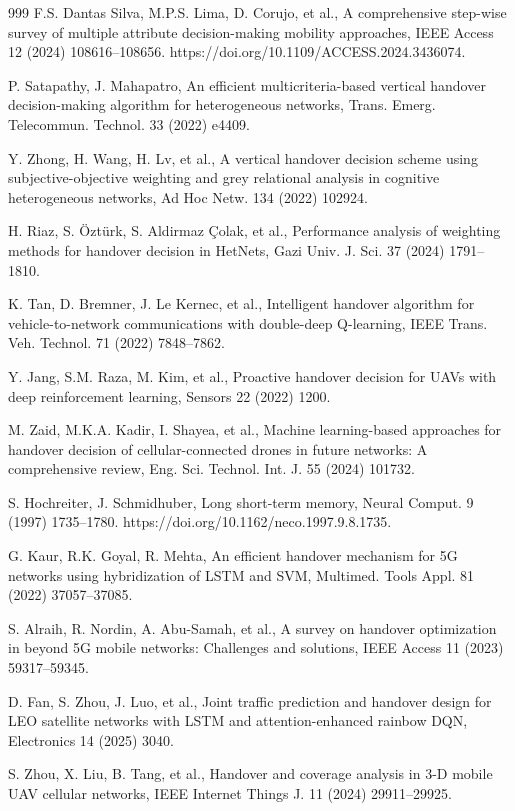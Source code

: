 \documentclass[preprint,12pt]{elsarticle}
\begin{document}
\begin{thebibliography}{999}
F.S. Dantas Silva, M.P.S. Lima, D. Corujo, et al., A comprehensive step-wise survey of multiple attribute decision-making mobility approaches, IEEE Access 12 (2024) 108616--108656. https://doi.org/10.1109/ACCESS.2024.3436074.

P. Satapathy, J. Mahapatro, An efficient multicriteria-based vertical handover decision-making algorithm for heterogeneous networks, Trans. Emerg. Telecommun. Technol. 33 (2022) e4409.

Y. Zhong, H. Wang, H. Lv, et al., A vertical handover decision scheme using subjective-objective weighting and grey relational analysis in cognitive heterogeneous networks, Ad Hoc Netw. 134 (2022) 102924.

H. Riaz, S. Öztürk, S. Aldirmaz Çolak, et al., Performance analysis of weighting methods for handover decision in HetNets, Gazi Univ. J. Sci. 37 (2024) 1791--1810.

K. Tan, D. Bremner, J. Le Kernec, et al., Intelligent handover algorithm for vehicle-to-network communications with double-deep Q-learning, IEEE Trans. Veh. Technol. 71 (2022) 7848--7862.

Y. Jang, S.M. Raza, M. Kim, et al., Proactive handover decision for UAVs with deep reinforcement learning, Sensors 22 (2022) 1200.

M. Zaid, M.K.A. Kadir, I. Shayea, et al., Machine learning-based approaches for handover decision of cellular-connected drones in future networks: A comprehensive review, Eng. Sci. Technol. Int. J. 55 (2024) 101732.

S. Hochreiter, J. Schmidhuber, Long short-term memory, Neural Comput. 9 (1997) 1735--1780. https://doi.org/10.1162/neco.1997.9.8.1735.

G. Kaur, R.K. Goyal, R. Mehta, An efficient handover mechanism for 5G networks using hybridization of LSTM and SVM, Multimed. Tools Appl. 81 (2022) 37057--37085.

S. Alraih, R. Nordin, A. Abu-Samah, et al., A survey on handover optimization in beyond 5G mobile networks: Challenges and solutions, IEEE Access 11 (2023) 59317--59345.

D. Fan, S. Zhou, J. Luo, et al., Joint traffic prediction and handover design for LEO satellite networks with LSTM and attention-enhanced rainbow DQN, Electronics 14 (2025) 3040.

S. Zhou, X. Liu, B. Tang, et al., Handover and coverage analysis in 3-D mobile UAV cellular networks, IEEE Internet Things J. 11 (2024) 29911--29925.


\end{thebibliography}
\end{document}
